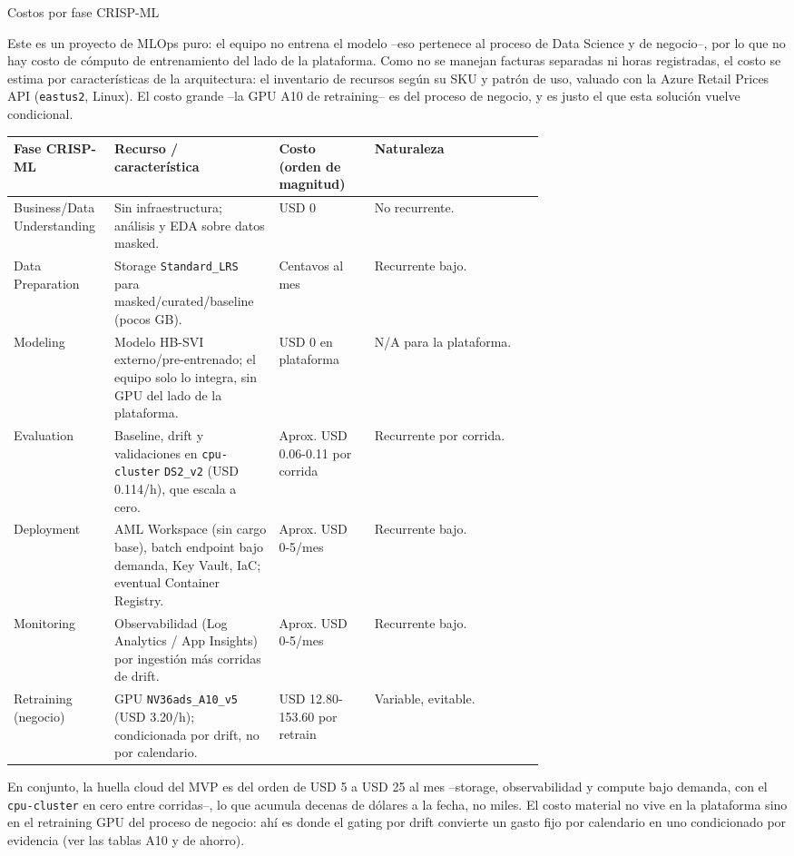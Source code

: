 \documentclass[11pt,letterpaper]{article}
\makeatletter
\renewcommand\subsection{\@startsection{subsection}{2}{\z@}
  {-3.25ex \@plus -1ex \@minus -.2ex}
  {1.5ex \@plus .2ex}
  {\large\bfseries\sffamily\color{azulTec}}}
\makeatother
\begin{document}
\subsection{Costos por fase CRISP-ML}

Este es un proyecto de MLOps puro: el equipo no entrena el modelo --eso pertenece al proceso de Data Science y de negocio--, por lo que no hay costo de cómputo de entrenamiento del lado de la plataforma. Como no se manejan facturas separadas ni horas registradas, el costo se estima por características de la arquitectura: el inventario de recursos según su SKU y patrón de uso, valuado con la Azure Retail Prices API (\texttt{eastus2}, Linux). El costo grande --la GPU A10 de retraining-- es del proceso de negocio, y es justo el que esta solución vuelve condicional.

\begin{tabularx}{\linewidth}{L{0.19\linewidth}L{0.31\linewidth}L{0.18\linewidth}Y}
\toprule
\textbf{Fase CRISP-ML} & \textbf{Recurso / característica} & \textbf{Costo (orden de magnitud)} & \textbf{Naturaleza} \\
\midrule
Business/Data Understanding & Sin infraestructura; análisis y EDA sobre datos masked. & USD 0 & No recurrente. \\
Data Preparation & Storage \texttt{Standard\_LRS} para masked/curated/baseline (pocos GB). & Centavos al mes & Recurrente bajo. \\
Modeling & Modelo HB-SVI externo/pre-entrenado; el equipo solo lo integra, sin GPU del lado de la plataforma. & USD 0 en plataforma & N/A para la plataforma. \\
Evaluation & Baseline, drift y validaciones en \texttt{cpu-cluster} \texttt{DS2\_v2} (USD 0.114/h), que escala a cero. & Aprox. USD 0.06-0.11 por corrida & Recurrente por corrida. \\
Deployment & AML Workspace (sin cargo base), batch endpoint bajo demanda, Key Vault, IaC; eventual Container Registry. & Aprox. USD 0-5/mes & Recurrente bajo. \\
Monitoring & Observabilidad (Log Analytics / App Insights) por ingestión más corridas de drift. & Aprox. USD 0-5/mes & Recurrente bajo. \\
Retraining (negocio) & GPU \texttt{NV36ads\_A10\_v5} (USD 3.20/h); condicionada por drift, no por calendario. & USD 12.80-153.60 por retrain & Variable, evitable. \\
\bottomrule
\end{tabularx}

En conjunto, la huella cloud del MVP es del orden de USD 5 a USD 25 al mes --storage, observabilidad y compute bajo demanda, con el \texttt{cpu-cluster} en cero entre corridas--, lo que acumula decenas de dólares a la fecha, no miles. El costo material no vive en la plataforma sino en el retraining GPU del proceso de negocio: ahí es donde el gating por drift convierte un gasto fijo por calendario en uno condicionado por evidencia (ver las tablas A10 y de ahorro).
\end{document}
